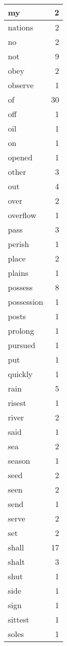 \begin{center}
\begin{longtable}{l|r}
my & 2 \\ \hline
nations & 2 \\ \hline
no & 2 \\ \hline
not & 9 \\ \hline
obey & 2 \\ \hline
observe & 1 \\ \hline
of & 30 \\ \hline
off & 1 \\ \hline
oil & 1 \\ \hline
on & 1 \\ \hline
opened & 1 \\ \hline
other & 3 \\ \hline
out & 4 \\ \hline
over & 2 \\ \hline
overflow & 1 \\ \hline
pass & 3 \\ \hline
perish & 1 \\ \hline
place & 2 \\ \hline
plains & 1 \\ \hline
possess & 8 \\ \hline
possession & 1 \\ \hline
posts & 1 \\ \hline
prolong & 1 \\ \hline
pursued & 1 \\ \hline
put & 1 \\ \hline
quickly & 1 \\ \hline
rain & 5 \\ \hline
risest & 1 \\ \hline
river & 2 \\ \hline
said & 1 \\ \hline
sea & 2 \\ \hline
season & 1 \\ \hline
seed & 2 \\ \hline
seen & 2 \\ \hline
send & 1 \\ \hline
serve & 2 \\ \hline
set & 2 \\ \hline
shall & 17 \\ \hline
shalt & 3 \\ \hline
shut & 1 \\ \hline
side & 1 \\ \hline
sign & 1 \\ \hline
sittest & 1 \\ \hline
soles & 1 \\ \hline

\end{longtable}
\end{center}
